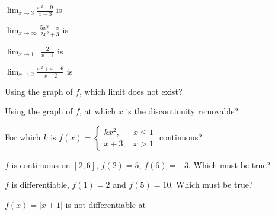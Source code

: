 \begin{exo}{}
$\displaystyle\lim_{x\to3}\frac{x^2-9}{x-3}$ is
\end{exo}
\begin{exo}{}
$\displaystyle\lim_{x\to\infty}\frac{5x^2-x}{2x^2+3}$ is
\end{exo}
\begin{exo}{}
$\displaystyle\lim_{x\to1^-}\frac{2}{x-1}$ is
\end{exo}
\begin{exo}{}
$\displaystyle\lim_{x\to2}\frac{x^2+x-6}{x-2}$ is
\end{exo}
\fgraph
\begin{exo}{}
Using the graph of $f$, which limit does not exist?
\end{exo}
\begin{exo}{}
Using the graph of $f$, at which $x$ is the discontinuity removable?
\end{exo}
\begin{exo}{}
For which $k$ is $f(x)=\begin{cases}kx^2, & x\le1\\ x+3, & x>1\end{cases}$ continuous?
\end{exo}
\begin{exo}{}
$f$ is continuous on $[2,6]$, $f(2)=5$, $f(6)=-3$. Which must be true?
\end{exo}
\begin{exo}{}
$f$ is differentiable, $f(1)=2$ and $f(5)=10$. Which must be true?
\end{exo}
\begin{exo}{}
$f(x)=|x+1|$ is not differentiable at
\end{exo}
